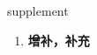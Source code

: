 
\begin{frame}
{\huge supplement}
\begin{center}
\begin{enumerate}\Large
  \item \textbf{增补，补充}
\end{enumerate}
\end{center}
\end{frame}
